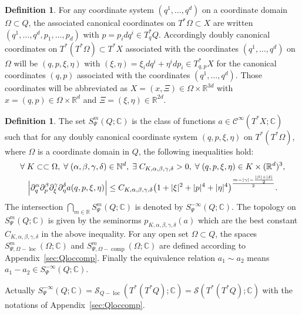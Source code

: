 \documentclass[10pt]{amsart}
\theoremstyle{definition}\newtheorem{defi}[theo]{Definition}\newtheorem{rema}[theo]{Remark}\newtheorem{exam}[theo]{Example}\newtheorem{exem}[theo]{Example}\newtheorem{nota}[theo]{Notation}
\newcommand{\C}{\mathbb{C}}
\newcommand{\R}{\mathbb{R}}
\newcommand{\N}{\mathbb{N}}
\newcommand{\clC}{\mathcal{C}}
\newcommand{\clS}{\mathcal{S}}
\DeclareMathOperator{\ccomp}{comp}
\DeclareMathOperator{\locc}{loc}
\let\oldexists\exists
\renewcommand*{\exists}{\mathrel{\oldexists}}
\let\oldforall\forall
\renewcommand*{\forall}{\mathrel{\oldforall}}
\let\originalleft\left
\let\originalright\right
\renewcommand{\left}{\mathopen{}\mathclose\bgroup\originalleft}
\renewcommand{\right}{\aftergroup\egroup\originalright}
\begin{document}
\begin{defi}\label{de:doubcancoord}
For any coordinate system $(q^{1},\dots, q^{d})$ on a coordinate domain $\Omega\subset Q$, the associated canonical coordinates on $T^{*}\Omega\subset X$ are written $(q^{1},\dots,q^{d},p_{1},\dots,p_{d})$ with $p=p_{i}dq^{i}\in T^{*}_{q}Q$. Accordingly doubly canonical coordinates on $T^{*}(T^{*}\Omega)\subset T^{*}X$ associated with the coordinates $(q^{1},\dots,q^{d})$ on $\Omega$ will be $(q,p,\xi,\eta)$ with $(\xi,\eta)=\xi_{i}dq^{i}+\eta^{i}dp_{i}\in T^{*}_{q,p}X$ for the canonical coordinates $(q,p)$ associated with the coordinates $(q^{1},\dots,q^{d})$. Those coordinates will be abbreviated as $X=(x,\Xi)\in \Omega\times\R^{3d}$ with $x=(q,p)\in \Omega\times \R^{d}$ and $\Xi=(\xi,\eta)\in \R^{2d}$.
\end{defi}

\begin{defi}\label{de:symbol}
The set $S^{m}_{\Psi}(Q;\C)$ is the class of functions $a\in \clC^{\infty}(T^{*}X;\C)$ such that for any doubly canonical coordinate system $(q,p,\xi,\eta)$ on $T^{*}(T^{*}\Omega)$, where $\Omega$ is a coordinate domain in $Q$, the following inequalities hold:
\begin{multline}\label{eq:Sloc}
\forall K\subset\subset \Omega,\;\forall (\alpha,\beta,\gamma,\delta)\in \N^{d},\;\exists C_{K,\alpha,\beta,\gamma,\delta}>0,\;\forall (q,p,\xi,\eta)\in K\times (\R^{d})^{3},\\
\left|\partial_{q}^{\alpha}\partial_{p}^{\beta}\partial_{\xi}^{\gamma}\partial_{\eta}^{\delta}a(q,p,\xi,\eta)\right|\leq C_{K,\alpha,\beta,\gamma,\delta}\left(1+|\xi|^{2}+|p|^{4}+|\eta|^{4}\right)^{\frac{m-|\gamma|-\frac{|\beta|+|\delta|}{2}}{2}}.
\end{multline}
The intersection $\bigcap_{m\in \R}S^{m}_{\Psi}(Q;\C)$ is denoted by $S^{-\infty}_{\Psi}(Q;\C)$. The topology on $S^{m}_{\Psi}(Q;\C)$ is given by the seminorms $p_{K,\alpha,\beta,\gamma,\delta}(a)$ which are the best constant $C_{K,\alpha,\beta,\gamma,\delta}$ in the above inequality. For any open set $\Omega\subset Q$, the spaces $S^{m}_{\Psi,\Omega-\locc}(\Omega;\C)$ and $S^{m}_{\Psi, \Omega-\ccomp}(\Omega;\C)$ are defined according to Appendix~\ref{sec:Qloccomp}. Finally the equivalence relation $a_{1}\sim a_{2}$ means $a_{1}-a_{2}\in S^{-\infty}_{\Psi}(Q;\C)$.
\end{defi}

Actually $S^{-\infty}_{\Psi}(Q;\C)=\clS_{Q-\locc}(T^{*}(T^{*}Q);\C)=\clS(T^{*}(T^{*}Q);\C)$ with the notations of Appendix~\ref{sec:Qloccomp}.
\end{document}
